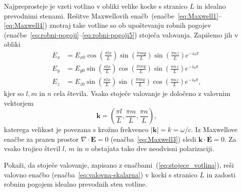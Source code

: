 Najpreprosteje je vzeti votlino v obliki velike kocke s stranico
$L$ in idealno prevodnimi stenami. Rešitve Maxwellovih enačb~(enačbe~\ref{eq:Maxwell1}--\ref{eq:Maxwell4}) 
znotraj take votline so ob upoštevanju robnih pogojev 
(enačbe~\ref{eq:robni-pogoji}--\ref{eq:robni-pogoji5}) 
stoječa valovanja. Zapišemo jih v obliki
\begin{align}
E_{x} & =  E_{x0}\cos\left(\frac{\pi lx}{L}\right)\sin\left(\frac{\pi my}{L}\right)\sin\left(\frac{\pi nz}{L}\right)e^{-i\omega t}\nonumber \\
E_{y} & =  E_{y0}\sin\left(\frac{\pi lx}{L}\right)\cos\left(\frac{\pi my}{L}\right)\sin\left(\frac{\pi nz}{L}\right)e^{-i\omega t}\nonumber \\
E_{z} & =  E_{z0}\sin\left(\frac{\pi lx}{L}\right)\sin\left(\frac{\pi my}{L}\right)\cos\left(\frac{\pi nz}{L}\right)e^{-i\omega t},
\label{eq:stojece_votlina}
\end{align}
kjer so $l,m$ in $n$ cela števila. Vsako stoječe valovanje je določeno z valovnim 
vektorjem
\begin{equation}
\mathbf{k}=\left(\frac{\pi l}{L},\frac{\pi m}{L},\frac{\pi n}{L}\right),
\end{equation} 
katerega velikost je povezana s krožno frekvenco $|\mathbf{k}|= k = \omega/c$.
Iz Maxwellove enačbe za prazen prostor $\nabla\cdot\mathbf{E}=0$ (enačba~\ref{eq:Maxwell3})
sledi $\mathbf{k}\cdot\mathbf{E}=0$. 
Za vsako trojico števil $l$, $m$ in $n$ obstajata tako dve
neodvisni polarizaciji.

\begin{definition}
 Pokaži, da stoječe valovanje, zapisano z enačbami~(\ref{eq:stojece_votlina}), reši 
 valovno enačbo (enačba~\ref{eq:valovna-skalarna}) v 
 kocki s stranico $L$ in zadosti robnim pogojem idealno prevodnih sten votline.
\end{definition}

